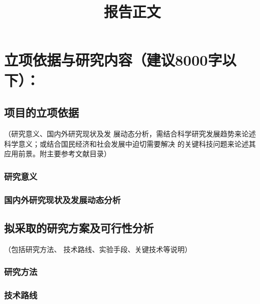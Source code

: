 \documentclass[a4paper,12pt, AutoFakeBold, fontset=adobe]{ctexart}
\title{\bfseries\kaishu\zihao{3} 报告正文}
\author{\vspace{-2cm}}
\date{\vspace{-2cm}}
\begin{document}
\maketitle

\section{立项依据与研究内容（建议8000字以下）：}

\subsection{项目的立项依据}{\color{nsfcblue}\kaishu\noindent（研究意义、国内外研究现状及发
  展动态分析，需结合科学研究发展趋势来论述科学意义；或结合国民经济和社会发展中迫切需要解决
  的关键科技问题来论述其应用前景。附主要参考文献目录）}



\subsubsection{研究意义}

\subsubsection{国内外研究现状及发展动态分析}

\renewcommand\refname{\subsubsection{主要参考文献}}
\begin{spacing}{0.9}


\end{spacing}


\subsection{拟采取的研究方案及可行性分析}{\color{nsfcblue}\kaishu\noindent（包括研究方法、
  技术路线、实验手段、关键技术等说明）}


\subsubsection{研究方法}

\subsubsection{技术路线}
\end{document}
